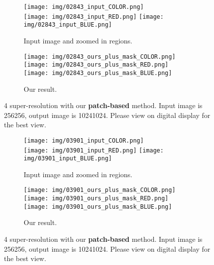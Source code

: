 \documentclass[10pt,twocolumn,letterpaper]{article}
\begin{document}
\begin{figure*}[th]
\begin{center}
    \begin{subfigure}[b]{0.4 \textwidth}
        \texttt{[image: img/02843\_input\_COLOR.png]}
        \\
        \texttt{[image: img/02843\_input\_RED.png]}
        \texttt{[image: img/02843\_input\_BLUE.png]}
        \caption{Input image  and zoomed in regions.}
    \end{subfigure}
    \begin{subfigure}[b]{0.4 \textwidth}
        \texttt{[image: img/02843\_ours\_plus\_mask\_COLOR.png]}
        \\
        \texttt{[image: img/02843\_ours\_plus\_mask\_RED.png]}
        \texttt{[image: img/02843\_ours\_plus\_mask\_BLUE.png]}
        \caption{Our result.}
    \end{subfigure}
\end{center}
\caption{4 super-resolution with our \textbf{patch-based} method. Input image is 256256, output image is 10241024. Please view on digital display for the best view.}
\label{fig:appendix}
\end{figure*}

\begin{figure*}[th]
\begin{center}
    \begin{subfigure}[b]{0.4 \textwidth}
        \texttt{[image: img/03901\_input\_COLOR.png]}
        \\
        \texttt{[image: img/03901\_input\_RED.png]}
        \texttt{[image: img/03901\_input\_BLUE.png]}
        \caption{Input image  and zoomed in regions.}
    \end{subfigure}
    \begin{subfigure}[b]{0.4 \textwidth}
        \texttt{[image: img/03901\_ours\_plus\_mask\_COLOR.png]}
        \\
        \texttt{[image: img/03901\_ours\_plus\_mask\_RED.png]}
        \texttt{[image: img/03901\_ours\_plus\_mask\_BLUE.png]}
        \caption{Our result.}
    \end{subfigure}
\end{center}
\caption{4 super-resolution with our \textbf{patch-based} method. Input image is 256256, output image is 10241024. Please view on digital display for the best view.}
\label{fig:appendix}
\end{figure*}






  
\end{document}
